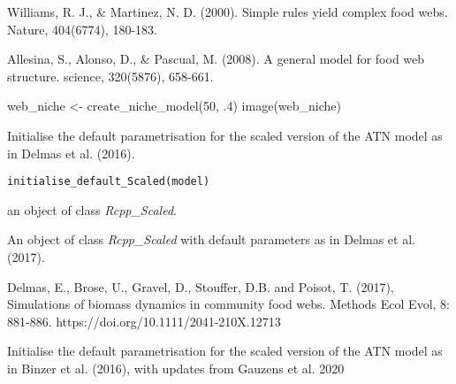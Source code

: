 \documentclass[letterpaper]{book}
\begin{document}
%
\begin{References}\relax
Williams, R. J., \& Martinez, N. D. (2000). Simple rules yield
complex food webs. Nature, 404(6774), 180-183.

Allesina, S., Alonso, D., \& Pascual, M. (2008). A general model for food
web structure. science, 320(5876), 658-661.
\end{References}
%
\begin{Examples}
\begin{ExampleCode}
web_niche <- create_niche_model(50, .4)
image(web_niche)
\end{ExampleCode}
\end{Examples}
%
\begin{Description}\relax
Initialise the default parametrisation for the scaled version of
the ATN model as in Delmas et al. (2016).
\end{Description}
%
\begin{Usage}
\begin{verbatim}
initialise_default_Scaled(model)
\end{verbatim}
\end{Usage}
%
\begin{Arguments}
\begin{ldescription}
\item[\code{model}] an object of class \emph{Rcpp\_Scaled}.
\end{ldescription}
\end{Arguments}
%
\begin{Value}
An object of class \emph{Rcpp\_Scaled} with default
parameters as in Delmas et al. (2017).
\end{Value}
%
\begin{References}\relax
Delmas, E., Brose, U., Gravel, D., Stouffer, D.B. and Poisot, T.
(2017), Simulations of biomass dynamics in community food webs. Methods
Ecol Evol, 8: 881-886. https://doi.org/10.1111/2041-210X.12713
\end{References}
%
\begin{Description}\relax
Initialise the default parametrisation for the scaled version of
the ATN model as in Binzer et al. (2016), with updates from Gauzens et al. 2020
\end{Description}
\end{document}
